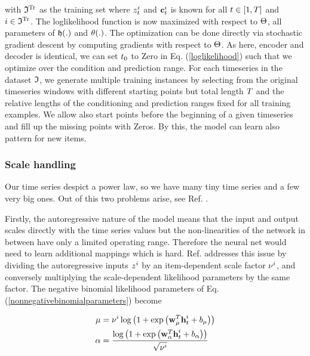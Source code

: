 \documentclass[11pt,headings=small]{scrartcl}
\begin{document}
with $\frak{I}^{\text{Tr}}$ as the training set where $z^{i}_{t}$ and $\textbf{c}^{i}_{t}$ is known for all $t\in[1,T]$ and $i\in\frak{I}^{\text{Tr}}$. The loglikelihood function is now maximized with respect to $\Theta$, all parameters of $\frak{h}(.)$ and $\theta(.)$. The optimization can be done directly via stochastic gradient descent by computing gradients with respect to  $\Theta$. As here, encoder and decoder is identical, we can set $t_{0}$ to Zero in Eq. (\ref{loglikelihood}) such that we optimize over the condition and prediction range. For each timeseries in the dataset $\frak{I}$, we generate multiple training instances by selecting from the original timeseries windows with different starting points but  total length $T$ and the relative lengths of the conditioning and prediction ranges fixed for all training examples. We allow also start points before the beginning of a given timeseries and fill up the missing points with Zeros. By this, the model can learn also pattern for new items.

\subsubsection{Scale handling}
\label{subsubsection:App1lScaleHandling}

Our time series despict a power law, so we have many tiny time series and a few very big ones. Out of this two problems arise, see Ref. \cite{SALINAS20201181}.

Firstly, the autoregressive nature of the model means that the input and output scales directly with the time series values but the non-linearities of the network in between have only a limited operating range. Therefore the neural net would need to learn additional mappings which is hard. Ref. \cite{SALINAS20201181} addresses this issue by dividing the autoregressive inputs $z^{i}$ by an item-dependent scale factor $\nu^{i}$, and conversely multiplying the scale-dependent likelihood parameters by the same factor. The negative binomial likelihood parameters of Eq. (\ref{nonnegativebinomialparameters}) become

\begin{subequations}\label{nonnegativebinomialparametersscaled}
	\begin{align}
	\mu &= \nu^{i}\log\left(1 + \exp\left(\textbf{w}^{T}_{\mu}\textbf{h}_{t}^{i} + b_{\mu}\right)\right)\\
	\alpha &= \frac{\log\left(1 + \exp\left(\textbf{w}^{T}_{\alpha}\textbf{h}_{t}^{i} + b_{\alpha}\right)\right)}{\sqrt{\nu^{i}}} 
	\end{align}
\end{subequations}
\end{document}
